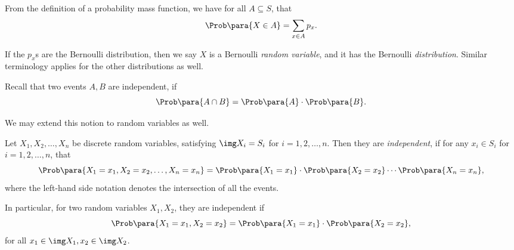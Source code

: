 From the definition of a probability mass function, we have for all \(A \subseteq S\), that
\[
    \Prob\para{X \in A} = \sum_{x \in A} p_x.
\]

If the \(p_x\)s are the Bernoulli distribution, then we say \(X\) is a Bernoulli \emph{random variable}, and it has the Bernoulli \emph{distribution}. Similar terminology applies for the other distributions as well.

Recall that two events \(A, B\) are independent, if
\[
    \Prob \para{A \cap B} = \Prob\para{A} \cdot \Prob\para{B}.
\]

We may extend this notion to random variables as well.

\begin{definition}
    \label{def:independence-random-variable}%
    Let \(X_1, X_2, \ldots, X_n\) be discrete random variables, satisfying \(\img X_i = S_i\) for \(i = 1, 2, \ldots, n\). Then they are \emph{independent}, if for any \(x_i \in S_i\) for \(i = 1, 2, \ldots, n\), that
    \[
        \Prob\para{X_1 = x_1, X_2 = x_2, \ldots, X_n = x_n} = \Prob\para{X_1 = x_1} \cdot \Prob\para{X_2 = x_2} \cdots \Prob\para{X_n = x_n},
    \]
    where the left-hand side notation denotes the intersection of all the events.
\end{definition}

In particular, for two random variables \(X_1, X_2\), they are independent if
\[
    \Prob\para{X_1 = x_1, X_2 = x_2} = \Prob\para{X_1 = x_1} \cdot \Prob\para{X_2 = x_2},
\]
for all \(x_1 \in \img X_1, x_2 \in \img X_2\).


